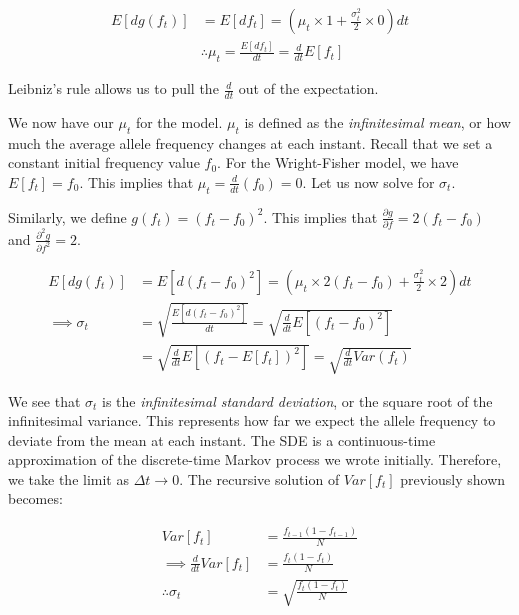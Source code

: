 \begin{equation}
    \begin{split}
         E[dg(f_t)] &= E[df_t] = (\mu_t \times 1 + \frac{\sigma_t^2}{2} \times 0)dt \\
         & \therefore \mu_t = \frac{E[df_t]}{dt} = \frac{d}{dt}E[f_t]
    \end{split}
\end{equation}


Leibniz's rule allows us to pull the $\frac{d}{dt}$ out of the expectation. 


We now have our $\mu_t$ for the model. $\mu_t$ is defined as the \textit{infinitesimal mean}, or how much the average allele frequency changes at each instant. Recall that we set a constant initial frequency value $f_0$. For the Wright-Fisher model, we have $E[f_t] = f_0$. This implies that $\mu_t = \frac{d}{dt} (f_0) = 0$. Let us now solve for $\sigma_t$.


Similarly, we define $g(f_t) = (f_t - f_0)^2$. This implies that $\frac {\partial g}{\partial f} = 2(f_t - f_0)$ and $\frac{\partial^2 g}{\partial f^2} = 2$.


\begin{equation}
    \begin{split}
         E[dg(f_t)] &= E[d(f_t-f_0)^2] = (\mu_t \times 2(f_t - f_0) + \frac{\sigma_t^2}{2} \times 2)dt \\
         \implies \sigma_t &= \sqrt{\frac{E[d(f_t-f_0)^2]}{dt}} = \sqrt{\frac{d}{dt}E[(f_t-f_0)^2]} \\
         &= \sqrt{\frac{d}{dt}E[(f_t-E[f_t])^2]} = \sqrt{\frac{d}{dt}Var(f_t)}
    \end{split}
\end{equation}


We see that $\sigma_t$ is the \textit{infinitesimal standard deviation}, or the square root of the infinitesimal variance. This represents how far we expect the allele frequency to deviate from the mean at each instant. The SDE is a continuous-time approximation of the discrete-time Markov process we wrote initially. Therefore, we take the limit as $\Delta t \to 0$. The recursive solution of $Var[f_t]$ previously shown becomes:


\begin{equation}
    \begin{split}
         Var[f_t] &= \frac{f_{t-1}(1-f_{t-1})}{N} \\
         \implies \frac{d}{dt} Var[f_t] &= \frac{f_t(1-f_t)}{N} \\
         \therefore \sigma_t &= \sqrt{\frac{f_t(1-f_t)}{N}}
    \end{split}
\end{equation}

